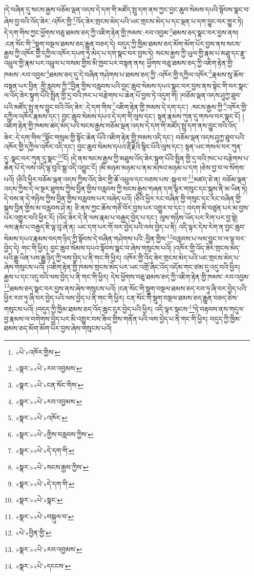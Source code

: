 །དེ་བཞིན་དུ་སངས་རྒྱས་བཅོམ་ལྡན་འདས་དེ་དག་གི་མཛོད་སྤུ་དག་ནས་ཀྱང་བྱང་ཆུབ་སེམས་དཔའི་སྟོབས་སྣང་བ་ཞེས་བྱ་བའི་འོད་ཟེར་:འཁོར་གྱི་\footnote{«པེ་»འཁོར་གྱིས་}འོད་ཟེར་གྲངས་མེད་པའི་ཡང་གྲངས་མེད་པ་དང་ལྡན་པ་དག་བྱུང་བར་གྱུར་ཏེ། དེ་དག་གིས་ཀྱང་ཕྱོགས་བཅུ་ཐམས་ཅད་ཀྱི་འཇིག་རྟེན་གྱི་ཁམས་:རབ་འབྱམ་\footnote{«སྣར་»«པེ་»རབ་འབྱམས་}ཐམས་ཅད་སྣང་བར་བྱས་ནས། :ངན་སོང་གི་\footnote{«སྣར་»«པེ་»ངན་སོང་གིས་}སྡུག་བསྔལ་ཐམས་ཅད་རྒྱུན་བཅད་དེ། བདུད་ཀྱི་ཁྱིམ་ཐམས་ཅད་མོག་མོག་པོར་བྱས་ནས་སངས་རྒྱས་ཀྱི་འཁོར་གྱི་དཀྱིལ་འཁོར་དཔག་ཏུ་མེད་པ་དག་སྣང་བར་བྱས་ཏེ། སངས་རྒྱས་ཀྱི་ཡུལ་གྱི་རྣམ་པ་མཐུ་དང་རྫུ་འཕྲུལ་གྱི་རྣམ་པར་འཕྲུལ་པ་བསམ་གྱིས་མི་ཁྱབ་པར་བསྟན་ནས། ཕྱོགས་བཅུ་ཐམས་ཅད་ཀྱི་འཇིག་རྟེན་གྱི་ཁམས་:རབ་འབྱམ་\footnote{«སྣར་»«པེ་»རབ་འབྱམས་}ཐམས་ཅད་དུ་དེ་བཞིན་གཤེགས་པ་ཐམས་ཅད་ཀྱི་:འཁོར་གྱི་དཀྱིལ་འཁོར་\footnote{«སྣར་»«པེ་»འཁོར་}རྣམས་སུ་ཆོས་བསྟན་པར་བྱིན་:གྱི་རླབས་ཀྱི་\footnote{«སྣར་»«པེ་»གྱིས་བརླབས་ཀྱིས་}བྱིན་གྱིས་བརླབས་པའི་བྱང་ཆུབ་སེམས་དཔའ་སྣང་བར་བྱས་ནས་སྟེང་གི་བར་སྣང་ལ་འོད་ཟེར་སྟུག་པོའི་སྤྲིན་གྱི་དྲ་བའི་ཁང་པ་བརྩེགས་པ་ཆེན་པོ་བྱས་ཏེ་འདུག་གོ། །བཅོམ་ལྡན་འདས་ཤཱཀྱ་ཐུབ་པའི་མཛོད་སྤུ་ནས་བྱུང་བའི་འོད་ཟེར་:དེ་དག་གིས་\footnote{«སྣར་»«པེ་»དེ་དག་གི་}འཇིག་རྟེན་གྱི་ཁམས་དེ་དག་དང་། :སངས་རྒྱས་ཀྱི་\footnote{«སྣར་»«པེ་»སངས་རྒྱས་ཀྱིས་}འཁོར་གྱི་དཀྱིལ་འཁོར་རྣམས་དང་། བྱང་ཆུབ་སེམས་དཔའ་དེ་དག་གི་ལུས་དང་། སྟན་རྣམས་ཀུན་དུ་གསལ་བར་སྣང་ངོ། །འཇིག་རྟེན་གྱི་ཁམས་ཚད་མེད་པའི་སངས་རྒྱས་བཅོམ་ལྡན་འདས་དེ་དག་གི་མཛོད་སྤུ་དག་ནས་བྱུང་བའི་འོད་ཟེར་:དེ་དག་གིས་\footnote{«སྣར་»«པེ་»དེ་དག་གི་}སྟོང་གསུམ་གྱི་སྟོང་ཆེན་པོའི་འཇིག་རྟེན་གྱི་ཁམས་འདི་དང་། བཅོམ་ལྡན་འདས་ཤཱཀྱ་ཐུབ་པའི་འཁོར་གྱི་དཀྱིལ་འཁོར་འདི་དང་། བྱང་ཆུབ་སེམས་དཔའ་རྡོ་རྗེའི་སྙིང་པོའི་ལུས་དང་། སྟན་ཡང་གསལ་བར་ཀུན་དུ་:སྣང་བར་ཀུན་དུ་སྣང་\footnote{«སྣར་»«པེ་»སྣང་}ངོ། །དེ་ནས་སངས་རྒྱས་ཀྱི་མཐུས་འོད་ཟེར་སྟུག་པོའི་སྤྲིན་གྱི་དྲ་བའི་ཁང་པ་བརྩེགས་པ་ཆེན་པོ་དེ་ལས་འདི་ལྟ་བུའི་སྒྲ་འདི་འབྱུང་ངོ། །མི་མཉམ་མཉམ་པ་ནམ་མཁའ་མཉམ་པ་དག །ཅེས་བྱ་བ་ལ་སོགས་པའོ། །ཅིའི་ཕྱིར་བཅོམ་ལྡན་འདས་ཀྱིས་འོད་ཟེར་གྱི་ཆོ་འཕྲུལ་དང་བཅས་པས་:སྐུལ་བ་\footnote{«སྣར་»«པེ་»བསྐུལ་བ་}མཛད་ཅེ་ན། བཅོམ་ལྡན་འདས་ཀྱིས་དེ་ལ་སྔར་ཐུགས་ཀྱིས་བྱིན་གྱིས་བརླབས་ཀྱི་སངས་རྒྱས་གཞན་དག་ལྟར་གསུང་དང་སྐུས་ནི་མ་ཡིན་ཏེ། དེ་བས་ན་དེ་གཉིས་ཀྱིས་བྱིན་གྱིས་བརླབས་པར་བཞེད་པའོ། །ཅིའི་ཕྱིར་རང་བཞིན་གྱི་གསུང་དང་རང་བཞིན་གྱི་སྐུས་བྱིན་གྱིས་མ་བརླབས་ཤེ་ན། ཅི་ནས་ཀྱང་ཆོས་གཙོ་བོར་བྱས་པར་འགྱུར་བ་དང་། བདག་མི་བཙུན་པར་མ་བྱས་པར་འགྱུར་བའི་ཕྱིར་རོ། །འོད་ཟེར་དེ་ནི་ལས་རྣམ་པ་བརྒྱད་བྱེད་པ་དང་། ལུས་གཉིས་ཡོད་པར་རིག་པར་བྱ་སྟེ། ལས་རྣམ་པ་བརྒྱད་ཇི་ལྟ་བུ་ཞེ་ན། ཡང་དག་པར་གོ་བར་བྱེད་པའི་ལས་བྱེད་པ་ནི། འདི་ལྟར་དེས་རེག་ན་བྱང་ཆུབ་སེམས་དཔའ་རྣམས་བདག་ཉིད་ཀྱི་སྟོབས་དེ་བཞིན་གཤེགས་པའི་:བྱིན་གྱིས་\footnote{«པེ་»བྱིན་གྱི་}བརླབས་པ་ལས་བྱུང་བ་ལ་ལྟ་བར་བྱེད་དེ། གང་གི་ཕྱིར། བྱང་ཆུབ་སེམས་དཔའ་སྟོབས་སྣང་བ་ཞེས་གསུངས་པའོ། །འཁོར་གྱི་འོད་ཟེར་གྲངས་མེད་པའི་རྒྱུ་ཡིན་པས་རྒྱུ་ཉིད་ཀྱི་ལས་བྱེད་པ་ནི་གང་གི་ཕྱིར། འཁོར་གྱི་འོད་ཟེར་གྲངས་མེད་པའི་ཡང་གྲངས་མེད་པ་ཞེས་གསུངས་པའོ། །འཇིག་རྟེན་གྱི་ཁམས་གྲངས་མེད་པར་ཡང་འགྲོ་ཞིང་འོད་འདོམ་གང་ཙམ་དུ་འདུ་བའི་ཕྱིར། རྒྱས་པ་དང་འདུ་བའི་ལས་བྱེད་པ་ནི་གང་གི་ཕྱིར། དེས་ཕྱོགས་བཅུ་ཐམས་ཅད་ཀྱི་འཇིག་རྟེན་གྱི་ཁམས་:རབ་འབྱམ་\footnote{«སྣར་»«པེ་»རབ་འབྱམས་}ཐམས་ཅད་སྣང་བར་བྱས་ནས་ཞེས་གསུངས་པའོ། །ངན་སོང་གི་སྡུག་བསྔལ་ཐམས་ཅད་རབ་ཏུ་ཞི་བར་བྱེད་པའི་ཕྱིར་རབ་ཏུ་ཞི་བར་བྱེད་པའི་ལས་བྱེད་པ་ནི་གང་གི་ཕྱིར། ངན་སོང་གི་སྡུག་བསྔལ་ཐམས་ཅད་རྒྱུན་བཅད་ཅེས་གསུངས་པའོ། །བདུད་ཀྱི་ཁྱིམ་ཐམས་ཅད་འོད་ཆུང་ངུར་བྱེད་པའི་ཕྱིར། འདི་ལྟར་སྡངས་\footnote{«སྣར་»«པེ་»དངངས་}ཏེ་བརྟབས་ནས་གདུལ་བྱ་རྣམས་ལ་བགེགས་བྱེད་པར་མི་འགྱུར་བས་ཟིལ་གྱིས་གནོན་པའི་ལས་བྱེད་པ་ནི་གང་གི་ཕྱིར། བདུད་ཀྱི་ཁྱིམ་ཐམས་ཅད་མོག་མོག་པོར་བྱས་ཞེས་གསུངས་པའོ། 